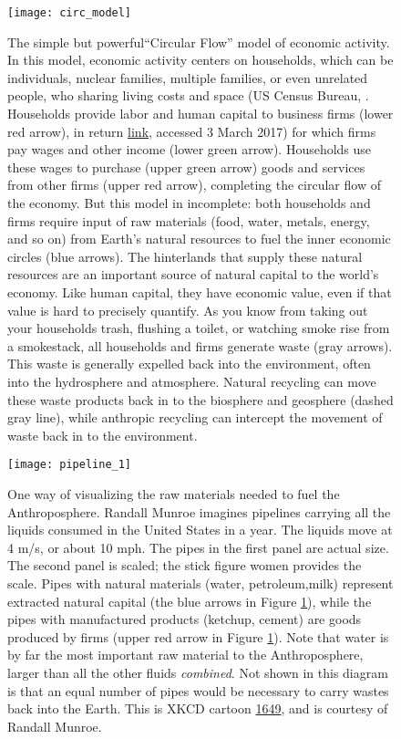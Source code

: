 \newpage
\begin{figure}[p]
\centering
  \texttt{[image: circ\_model]}%
\caption{The simple but powerful``Circular Flow'' model of economic activity. In this model, economic activity centers on households, which can be individuals, nuclear families, multiple families, or even unrelated people, who sharing living costs and space (US Census Bureau, . Households provide labor and human capital to business firms (lower red arrow), in return \href{https://www.census.gov/quickfacts/table/PST045216/00}{link}, accessed 3 March 2017) for which firms pay wages and other income (lower green arrow). Households use these wages to purchase (upper green arrow) goods and services from other firms (upper red arrow), completing the circular flow of the economy. But this model in incomplete: both households and firms require input of raw materials (food, water, metals, energy, and so on) from Earth's natural resources to fuel the inner economic circles (blue arrows). The hinterlands that supply these natural resources are an important source of natural capital to the world's economy. Like human capital, they have economic value, even if that value is hard to precisely quantify. As you know from taking out your households trash, flushing a toilet, or watching smoke rise from a smokestack, all households and firms generate waste (gray arrows). This waste is generally expelled back into the environment, often into the hydrosphere and atmosphere. Natural recycling can move these waste products back in to the biosphere and geosphere (dashed gray line), while anthropic recycling can intercept the movement of waste back in to the environment.} 

\label{fig:circ_flow}
\end{figure}


\newpage
\begin{figure}[p]
\centering
  \texttt{[image: pipeline\_1]}%

\caption{One way of visualizing the raw materials needed to fuel the Anthroposphere. Randall Munroe imagines pipelines carrying all the liquids consumed in the United States in a year. The liquids move at 4 m/s, or about 10 mph. The pipes in the first panel are actual size. The second panel is scaled; the stick figure women provides the scale. Pipes with natural materials (water, petroleum,milk) represent extracted natural capital (the blue arrows in Figure \ref{fig:circ_flow}), while the pipes with manufactured products (ketchup, cement) are goods produced by firms (upper red arrow in Figure \ref{fig:circ_flow}). Note that water is by far the most important raw material to the Anthroposphere, larger than all the other fluids \emph{combined}. Not shown in this diagram is that an equal number of pipes would be necessary to carry wastes back into the Earth. This is XKCD cartoon \href{https://xkcd.com/1649/}{1649}, and is courtesy of Randall Munroe.}

\label{fig:pipelines}
\end{figure}


